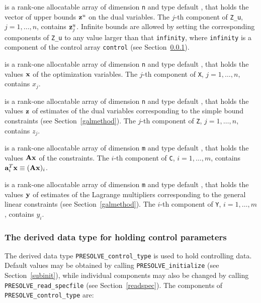 \documentclass{galahad}
\newcommand{\packagename}{PRESOLVE}
\begin{document}
\begin{description}
 is a rank-one allocatable array of dimension {\tt n} and type
default \realdp, that holds
the vector of upper bounds ${\mathbf{z}}^{u}$ on the dual variables.
The $j$-th component of {\tt Z\_u}, $j = 1, \ldots , n$,
contains ${\mathbf{z}}_{j}^{u}$.
Infinite bounds are allowed by setting the corresponding
components of {\tt Z\_u} to any value larger than that {\tt infinity},
where {\tt infinity} is a component of the control array {\tt control}
(see Section~\ref{typecontrol}).

 is a rank-one allocatable array of dimension {\tt n} and type
default \realdp,
that holds the values ${\mathbf{x}}$ of the optimization variables.
The $j$-th component of {\tt X}, $j = 1,  \ldots , n$, contains $x_{j}$.

 is a rank-one allocatable array of dimension {\tt n} and type default
\realdp, that holds
the values ${\mathbf{z}}$ of estimates  of the dual variables
corresponding to the simple bound constraints (see Section~\ref{galmethod}).
The $j$-th component of {\tt Z}, $j = 1,  \ldots ,  n$, contains $z_{j}$.

 is a rank-one allocatable array of dimension {\tt m} and type default
\realdp, that holds
the values ${\mathbf{A}} {\mathbf{x}}$ of the constraints.
The $i$-th component of {\tt C}, $i = 1,  \ldots ,  m$, contains
${\mathbf{a}}_{i}^{T}{\mathbf{x}} \equiv ({\mathbf{A}} {\mathbf{x}})_{i}$.

 is a rank-one allocatable array of dimension {\tt m} and type
default \realdp, that holds
the values ${\mathbf{y}}$ of estimates  of the Lagrange multipliers
corresponding to the general linear constraints (see Section~\ref{galmethod}).
The $i$-th component of {\tt Y}, $i = 1,  \ldots ,  m$, contains $y_{i}$.

\end{description}



\subsubsection{The derived data type for holding control
 parameters}\label{typecontrol}
The derived data type
{\tt \packagename\_control\_type}
is used to hold controlling data. Default values may be obtained by calling
{\tt \packagename\_initialize} (see Section~\ref{subinit}),
while individual components may also be changed by calling
{\tt \packagename\_read\-\_specfile}
(see Section~\ref{readspec}).
The components of
{\tt \packagename\_control\_type}
are:
\end{document}

